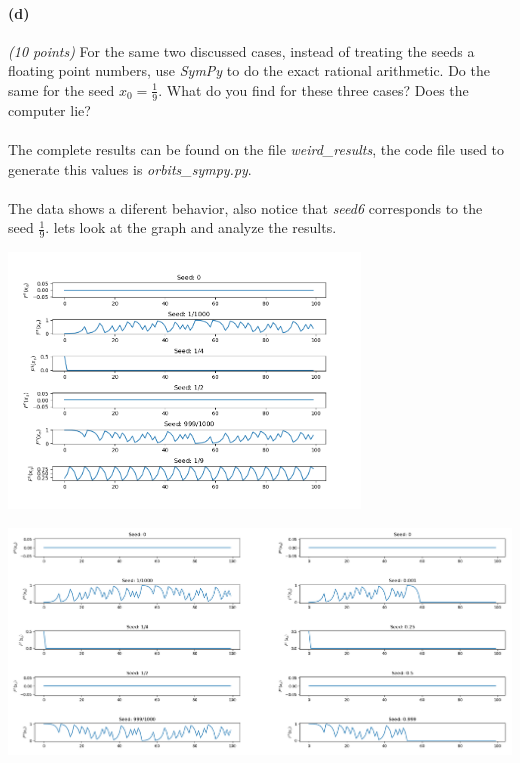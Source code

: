 \documentclass{article}
\begin{document}
\paragraph{(d)}\textit{(10 points)} For the same two discussed cases, instead of treating the seeds a floating point numbers, use \textit{SymPy} to do the exact rational arithmetic. Do the same for the seed $x_0=\frac{1}{9}$. What do you find for these three cases? Does the computer lie?
\begin{center}
\end{center}
\paragraph{} The complete results can be found on the file \textit{weird\_results}, the code file used to generate this values is \textit{orbits\_sympy.py}.
\paragraph{} The data shows a diferent behavior, also notice that \textit{seed6} corresponds to the seed $\frac{1}{9}$. lets look at the graph and analyze the results.
\begin{center}
	\includegraphics[width=0.7\textwidth]{plots_weird.png}
\end{center}
\begin{center}
	\includegraphics[width=\textwidth]{vs.png}
\end{center}
\end{document}
